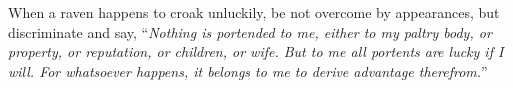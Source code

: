 When a raven happens to croak unluckily, be not overcome by appearances,
but discriminate and say, ``\emph{Nothing is portended to \emph{me}, either to my
paltry body, or property, or reputation, or children, or wife. But to
\emph{me} all portents are lucky if I will. For whatsoever happens, it belongs
to me to derive advantage therefrom.}''
